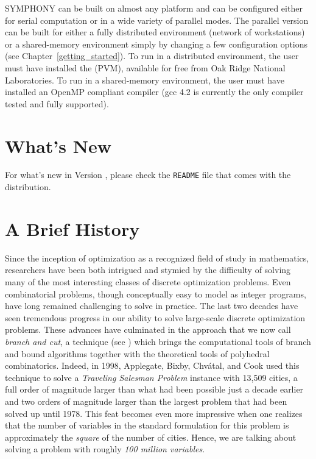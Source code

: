 SYMPHONY can be built on almost any platform and can be configured either for
serial computation or in a wide variety of parallel modes. The parallel
version can be built for either a fully distributed environment (network of
workstations) or a shared-memory environment simply by changing a few
configuration options (see Chapter~\ref{getting_started}). To run in a
distributed environment, the user must have installed the {\em
{}}
(PVM), available for free from Oak Ridge National Laboratories. To run in a
shared-memory environment, the user must have installed an OpenMP compliant
compiler (gcc 4.2 is currently the only compiler tested and fully supported).

\section{What's New}

For what's new in Version \VER, please check the \texttt{README}
file that comes with the distribution.

\section{A Brief History}
\label{history}

Since the inception of optimization as a recognized field of study in
mathematics, researchers have been both intrigued and stymied by the
difficulty of solving many of the most interesting classes of discrete
optimization problems. Even combinatorial problems, though conceptually easy
to model as integer programs, have long remained challenging to solve in
practice. The last two decades have seen tremendous progress in our ability to
solve large-scale discrete optimization problems. These advances have
culminated in the approach that we now call {\it branch and cut}, a technique
(see \cite{Grotschel84cut,padb:branc,hoff:LP}) which brings the computational
tools of branch and bound algorithms together with the theoretical tools of
polyhedral combinatorics. Indeed, in 1998, Applegate, Bixby, Chv\'atal, and
Cook used this technique to solve a {\em Traveling Salesman Problem} instance
with 13,509 cities, a full order of magnitude larger than what had been
possible just a decade earlier \cite{concorde} and two orders of magnitude
larger than the largest problem that had been solved up until 1978. This feat
becomes even more impressive when one realizes that the number of variables in
the standard formulation for this problem is approximately the {\em square} of
the number of cities. Hence, we are talking about solving a problem with
roughly {\em 100 million variables}.

